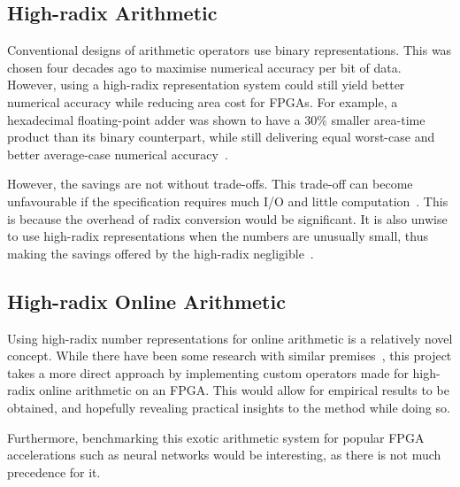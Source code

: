 \subsection{High-radix Arithmetic}
Conventional designs of arithmetic operators use binary representations.
This was chosen four decades ago to maximise numerical accuracy per bit of data.
However, using a high-radix representation system could still yield better
numerical accuracy while reducing area cost for FPGAs.
For example, a hexadecimal floating-point adder was shown to have a 30\% smaller
area-time product than its binary counterpart, while still delivering equal
worst-case and better average-case numerical accuracy~\cite{Catanzaro1}.

However, the savings are not without trade-offs.
This trade-off can become unfavourable if the specification requires much I/O
and little computation~\cite{Whyte1}.
This is because the overhead of radix conversion would be significant.
It is also unwise to use high-radix representations when the numbers are
unusually small, thus making the savings offered by the high-radix
negligible~\cite{Catanzaro1}.

\subsection{High-radix Online Arithmetic}
Using high-radix number representations for online arithmetic is a
relatively novel concept.
While there have been some research with similar
premises~\cite{Lynch1}\cite{Lynch2},
this project takes a more direct approach by implementing custom operators
made for high-radix online arithmetic on an FPGA.
This would allow for empirical results to be obtained, and hopefully revealing
practical insights to the method while doing so.

Furthermore, benchmarking this exotic arithmetic system for popular FPGA
accelerations such as neural networks would be interesting, as there is not
much precedence for it.
